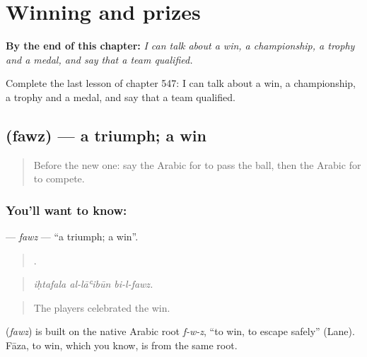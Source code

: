 
\chapter{Winning and prizes}
\label{ch:ar-winning-and-prizes}

\begin{chapteropening}
\textbf{By the end of this chapter:} \emph{I can talk about a win, a championship, a trophy and a medal, and say that a team qualified.}

Complete the last lesson of chapter 547: I can talk about a win, a championship, a trophy and a medal, and say that a team qualified.
\end{chapteropening}

\section[\texorpdfstring{\ar{فوز} (fawz)}{فوز (fawz)}]{ (fawz) — a triumph; a win}

\label{lesson:AR-C547-fawz}



\begin{quote}
Before the new one: say the Arabic for to pass the ball, then the Arabic for to compete.
\end{quote}

\subsection*{You'll want to know: }
\textbf{} — \emph{fawz} — \textquotedblleft{}a triumph; a win\textquotedblright{}.

\begin{quote}
  .
\end{quote}

\begin{quote}
\emph{iḥtafala al-lāʿibūn bi-l-fawz.}
\end{quote}

\begin{quote}
The players celebrated the win.
\end{quote}

\begin{cousinweb}
\textbf{} (\emph{fawz}) is built on the native Arabic root \emph{f-w-z}, \textquotedblleft{}to win, to escape safely\textquotedblright{} (Lane). Fāza, to win, which you know, is from the same root.
\end{cousinweb}

